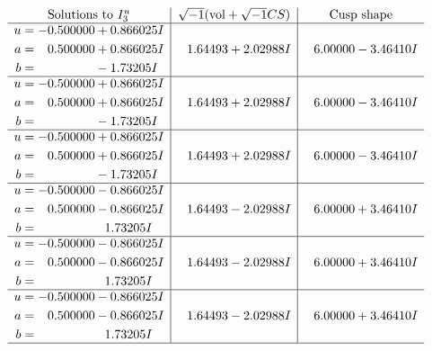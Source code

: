 \documentclass[1p]{elsarticle_modified}
\theoremstyle{definition}
\newcommand{\I}{\sqrt{-1}}
\begin{document}
$$\begin{array}{c|c|c}  
\text{Solutions to }I^u_{3}& \I (\text{vol} + \sqrt{-1}CS) & \text{Cusp shape}\\
 \hline 
\begin{aligned}
u &= -0.500000 + 0.866025 I \\
a &= \phantom{-}0.500000 + 0.866025 I \\
b &= \phantom{-0.000000 } -1.73205 I\end{aligned}
 & \phantom{-}1.64493 + 2.02988 I & \phantom{-}6.00000 - 3.46410 I \\ \hline\begin{aligned}
u &= -0.500000 + 0.866025 I \\
a &= \phantom{-}0.500000 + 0.866025 I \\
b &= \phantom{-0.000000 } -1.73205 I\end{aligned}
 & \phantom{-}1.64493 + 2.02988 I & \phantom{-}6.00000 - 3.46410 I \\ \hline\begin{aligned}
u &= -0.500000 + 0.866025 I \\
a &= \phantom{-}0.500000 + 0.866025 I \\
b &= \phantom{-0.000000 } -1.73205 I\end{aligned}
 & \phantom{-}1.64493 + 2.02988 I & \phantom{-}6.00000 - 3.46410 I \\ \hline\begin{aligned}
u &= -0.500000 - 0.866025 I \\
a &= \phantom{-}0.500000 - 0.866025 I \\
b &= \phantom{-0.000000 -}1.73205 I\end{aligned}
 & \phantom{-}1.64493 - 2.02988 I & \phantom{-}6.00000 + 3.46410 I \\ \hline\begin{aligned}
u &= -0.500000 - 0.866025 I \\
a &= \phantom{-}0.500000 - 0.866025 I \\
b &= \phantom{-0.000000 -}1.73205 I\end{aligned}
 & \phantom{-}1.64493 - 2.02988 I & \phantom{-}6.00000 + 3.46410 I \\ \hline\begin{aligned}
u &= -0.500000 - 0.866025 I \\
a &= \phantom{-}0.500000 - 0.866025 I \\
b &= \phantom{-0.000000 -}1.73205 I\end{aligned}
 & \phantom{-}1.64493 - 2.02988 I & \phantom{-}6.00000 + 3.46410 I\\
 \hline 
 \end{array}$$\newpage
\end{document}
